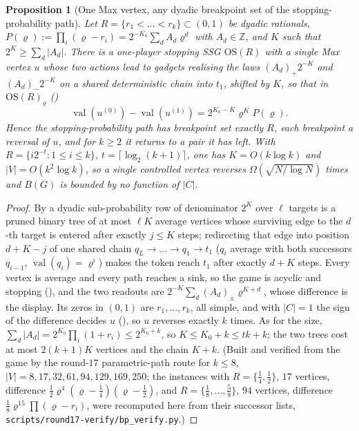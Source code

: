 \documentclass[11pt]{article}
\theoremstyle{plain}
\newtheorem{proposition}[theorem]{Proposition}
\theoremstyle{definition}
\DeclareMathOperator{\val}{val}
\begin{document}
\begin{proposition}[One Max vertex, any dyadic breakpoint set of the stopping-probability path]\label{prop:one-vertex-path}
Let $R=\{r_1<\dots<r_k\}\subset(0,1)$ be dyadic rationals,
$P(\varrho):=\prod_i(\varrho-r_i)=2^{-K_0}\sum_dA_d\varrho^{d}$ with
$A_d\in\mathbb Z$, and $K$ such that $2^{K}\ge\sum_d|A_d|$. There is a
one-player stopping SSG $\mathrm{OS}(R)$ with a single Max vertex $u$ whose
two actions lead to gadgets realising the laws $(A_d)_{+}2^{-K}$ and
$(A_d)_{-}2^{-K}$ on a shared deterministic chain into $t_1$, shifted by
$K$, so that in $\mathrm{OS}(R)_{\varrho}$ ()
\[
  \val(u^{(0)})-\val(u^{(1)})=2^{K_0-K}\varrho^{K}P(\varrho).
\]
Hence the stopping-probability path has breakpoint set exactly $R$, each
breakpoint a reversal of $u$, and for $k\ge2$ it returns to a pair it has
left. With $R=\{i2^{-t}:1\le i\le k\}$, $t=\lceil\log_2(k+1)\rceil$, one has
$K=O(k\log k)$ and $|V|=O(k^{2}\log k)$, so a single controlled vertex
reverses $\Omega(\sqrt{N/\log N})$ times and $B(G)$ is bounded by no
function of $|C|$.
\end{proposition}

\begin{proof}
By  a dyadic sub-probability row of denominator
$2^{K}$ over $\ell$ targets is a pruned binary tree of at most $\ell K$
average vertices whose surviving edge to the $d$-th target is entered after
exactly $j\le K$ steps; redirecting that edge into position $d+K-j$ of one
shared chain $q_L\to\dots\to q_1\to t_1$ ($q_i$ average with both successors
$q_{i-1}$, $\val(q_i)=\varrho^{i}$) makes the token reach $t_1$ after exactly
$d+K$ steps. Every vertex is average and every path reaches a sink, so the
game is acyclic and stopping (), and the two readouts are
$2^{-K}\sum_d(A_d)_{\pm}\varrho^{K+d}$, whose difference is the display. Its
zeros in $(0,1)$ are $r_1,\dots,r_k$, all simple, and with $|C|=1$ the sign
of the difference decides $u$ (), so $u$ reverses
exactly $k$ times. As for the size, $\sum_d|A_d|=2^{K_0}\prod_i(1+r_i)\le2^{K_0+k}$,
so $K\le K_0+k\le tk+k$; the two trees cost at most $2(k+1)K$ vertices and
the chain $K+k$. (Built and verified from the game by the round-$17$
parametric-path route for $k\le8$, $|V|=8,17,32,61,94,129,169,250$; the
instances with $R=\{\tfrac14,\tfrac12\}$, $17$ vertices, difference
$\tfrac12\varrho^{4}(\varrho-\tfrac14)(\varrho-\tfrac12)$, and
$R=\{\tfrac18,\dots,\tfrac58\}$, $94$ vertices, difference
$\tfrac18\varrho^{15}\prod(\varrho-r_i)$, were recomputed here from their
successor lists, \texttt{scripts/round17-verify/bp\_verify.py}.)
\end{proof}
\end{document}
